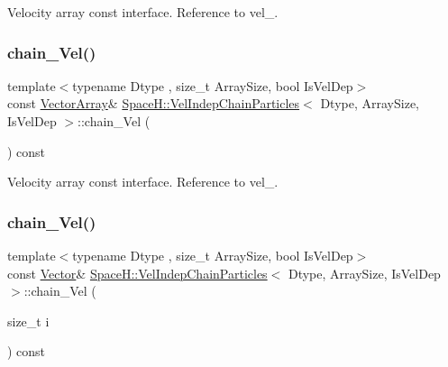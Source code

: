 Velocity array const interface. Reference to vel\+\_\+. 

\mbox{\label{class_space_h_1_1_vel_indep_chain_particles_a741064afd96c861eac50e8de239eedaa}} 
\subsubsection{\texorpdfstring{chain_\+Vel()}{chainVel()}\hspace{0.1cm}{\footnotesize\ttfamily [2/4]}}
{\footnotesize\ttfamily template$<$typename Dtype , size\+\_\+t Array\+Size, bool Is\+Vel\+Dep$>$ \\
const \mbox{\hyperlink{class_space_h_1_1_vel_indep_particles_aa9983058940249df8b00fa800e8cbad2}{Vector\+Array}}\& \mbox{\hyperlink{class_space_h_1_1_vel_indep_chain_particles}{Space\+H\+::\+Vel\+Indep\+Chain\+Particles}}$<$ Dtype, Array\+Size, Is\+Vel\+Dep $>$\+::chain_\+Vel (\begin{DoxyParamCaption}{ }\end{DoxyParamCaption}) const\hspace{0.3cm}{\ttfamily [inline]}}



Velocity array const interface. Reference to vel\+\_\+. 

\mbox{\label{class_space_h_1_1_vel_indep_chain_particles_a05d9529a4ee452b4c15efe92584a6d25}} 
\subsubsection{\texorpdfstring{chain_\+Vel()}{chainVel()}\hspace{0.1cm}{\footnotesize\ttfamily [3/4]}}
{\footnotesize\ttfamily template$<$typename Dtype , size\+\_\+t Array\+Size, bool Is\+Vel\+Dep$>$ \\
const \mbox{\hyperlink{class_space_h_1_1_vel_indep_particles_a61bbcfdb0dc7f99f3c68af69a755c935}{Vector}}\& \mbox{\hyperlink{class_space_h_1_1_vel_indep_chain_particles}{Space\+H\+::\+Vel\+Indep\+Chain\+Particles}}$<$ Dtype, Array\+Size, Is\+Vel\+Dep $>$\+::chain_\+Vel (\begin{DoxyParamCaption}\item[{size\+\_\+t}]{i }\end{DoxyParamCaption}) const\hspace{0.3cm}{\ttfamily [inline]}}



